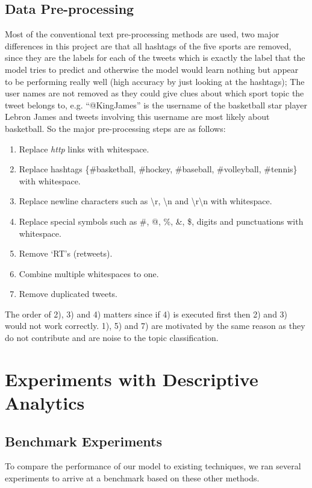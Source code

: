 \documentclass[journal, a4paper]{IEEEtran}
\begin{document}
\subsection{Data Pre-processing}
Most of the conventional text pre-processing methods are used, two major differences in this project are that all hashtags of the five sports are removed, since they are the labels for each of the tweets which is exactly the label that the model tries to predict and otherwise the model would learn nothing but appear to be performing really well (high accuracy by just looking at the hashtags); The user names are not removed as they could give clues about which sport topic the tweet belongs to, e.g. ``@KingJames'' is the username of the basketball star player Lebron James and tweets involving this username are most likely about basketball. So the major pre-processing steps are as follows:
\begin{enumerate}
\item Replace \textit{http} links with whitespace.
\item Replace hashtags \{\#basketball, \#hockey, \#baseball, \#volleyball, \#tennis\} with whitespace.
\item Replace newline characters such as \textbackslash r, \textbackslash n and \textbackslash r\textbackslash n with whitespace.
\item Replace special symbols such as \#, @, \%, \&, \$, digits and punctuations with whitespace.
\item Remove `RT's (retweets).
\item Combine multiple whitespaces to one.
\item Remove duplicated tweets.
\end{enumerate}

The order of 2), 3) and 4) matters since if 4) is executed first then 2) and 3) would not work correctly. 1), 5) and 7) are motivated by the same reason as they do not contribute and are noise to the topic classification.
\section{Experiments with Descriptive Analytics}
\subsection{Benchmark Experiments}
To compare the performance of our model to existing techniques, we ran several experiments to arrive at a  benchmark based on these other methods.
\end{document}

